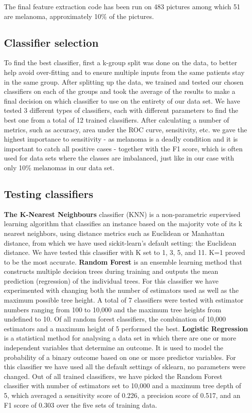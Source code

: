 The final feature extraction code has been run on 483 pictures among which 51 are melanoma, approximately 10\% of the pictures. 

\subsection{{Classifier selection}}
To find the best classifier, first a k-group split was done on the data, to better help avoid over-fitting and to ensure multiple inputs from the same patients stay in the same group. After splitting up the data, we trained and tested our chosen classifiers on each of the groups and took the average of the results to make a final decision on which classifier to use on the entirety of our data set.
\newline
We have tested 3 different types of classifiers, each with different parameters to find the best one from a total of 12 trained classifiers. After calculating a number of metrics, such as accuracy, area under the ROC curve, sensitivity, etc. we gave the highest importance to sensitivity - as melanoma is a deadly condition and it is important to catch all positive cases - together with the F1 score, which is often used for data sets where the classes are imbalanced, just like in our case with only 10\% melanomas in our data set.

\subsection{{Testing classifiers}}
\textbf{The K-Nearest Neighbours} classifier (KNN) is a non-parametric supervised learning algorithm that classifies an instance based on the majority vote of its k nearest neighbors, using distance metrics such as Euclidean or Manhattan distance, from which we have used sickit-learn’s default setting: the Euclidean distance. We have tested this classifier with K set to 1, 3, 5, and 11. K=1 proved to be the most accurate.
\newline
\textbf{Random Forest} is an ensemble learning method that constructs multiple decision trees during training and outputs the mean prediction (regression) of the individual trees. For this classifier we have experimented with changing both the number of estimators used as well as the maximum possible tree height. A total of 7 classifiers were tested with estimator numbers ranging from 100 to 10,000 and the maximum tree heights from undefined to 10. Of all random forest classifiers, the combination of 10,000 estimators and a maximum height of 5 performed the best.
\newline
\textbf{Logistic Regression} is a statistical method for analysing a data set in which there are one or more independent variables that determine an outcome. It is used to model the probability of a binary outcome based on one or more predictor variables. For this classifier we have used all the default settings of sklearn, no parameters were changed.
Out of all trained classifiers, we have picked the Random Forest classifier with number of estimators set to 10,000 and a maximum tree depth of 5, which averaged a sensitivity score of 0.226, a precision score of 0.517, and an F1 score of 0.303 over the five sets of training data.

